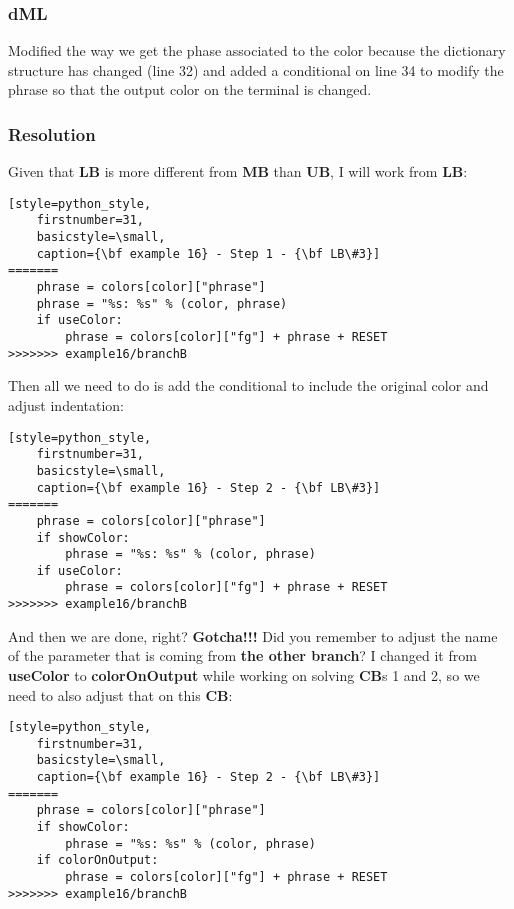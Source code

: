 \subsubsection{dML}
Modified the way we get the phase associated to the color because the dictionary structure has changed (line 32) and added a
conditional on line 34 to modify the phrase so that the output color on the terminal is changed.

\subsubsection{Resolution}
Given that {\bf LB} is more different from {\bf MB} than {\bf UB}, I will work from {\bf LB}:

\begin{lstlisting}[style=python_style,
	firstnumber=31,
	basicstyle=\small,
	caption={\bf example 16} - Step 1 - {\bf LB\#3}]
=======
    phrase = colors[color]["phrase"]
    phrase = "%s: %s" % (color, phrase)
    if useColor:
        phrase = colors[color]["fg"] + phrase + RESET
>>>>>>> example16/branchB
\end{lstlisting}

Then all we need to do is add the conditional to include the original color and adjust indentation:

\begin{lstlisting}[style=python_style,
	firstnumber=31,
	basicstyle=\small,
	caption={\bf example 16} - Step 2 - {\bf LB\#3}]
=======
    phrase = colors[color]["phrase"]
    if showColor:
        phrase = "%s: %s" % (color, phrase)
    if useColor:
        phrase = colors[color]["fg"] + phrase + RESET
>>>>>>> example16/branchB
\end{lstlisting}

And then we are done, right? {\bf Gotcha!!!} Did you remember to adjust the name of the parameter that is coming from
{\bf the other branch}? I changed it from {\bf useColor} to {\bf colorOnOutput} while working on solving {\bf CB}s 1 and 2, so we need to also adjust that on this {\bf CB}:

\begin{lstlisting}[style=python_style,
	firstnumber=31,
	basicstyle=\small,
	caption={\bf example 16} - Step 2 - {\bf LB\#3}]
=======
    phrase = colors[color]["phrase"]
    if showColor:
        phrase = "%s: %s" % (color, phrase)
    if colorOnOutput:
        phrase = colors[color]["fg"] + phrase + RESET
>>>>>>> example16/branchB
\end{lstlisting}

